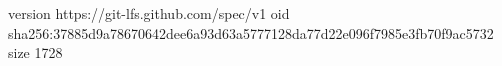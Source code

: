 version https://git-lfs.github.com/spec/v1
oid sha256:37885d9a78670642dee6a93d63a5777128da77d22e096f7985e3fb70f9ac5732
size 1728
